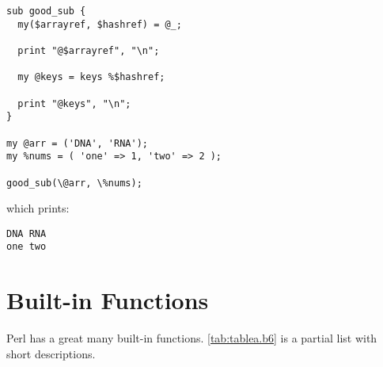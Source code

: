 \begin{lstlisting}
sub good_sub {
  my($arrayref, $hashref) = @_;

  print "@$arrayref", "\n";

  my @keys = keys %$hashref;

  print "@keys", "\n";
}

my @arr = ('DNA', 'RNA');
my %nums = ( 'one' => 1, 'two' => 2 );

good_sub(\@arr, \%nums);
\end{lstlisting}

which prints:

\begin{lstlisting}
DNA RNA
one two
\end{lstlisting}

\section{Built-in Functions}
Perl has a great many built-in functions. \autoref{tab:tablea.b6} is a partial list with short descriptions.

